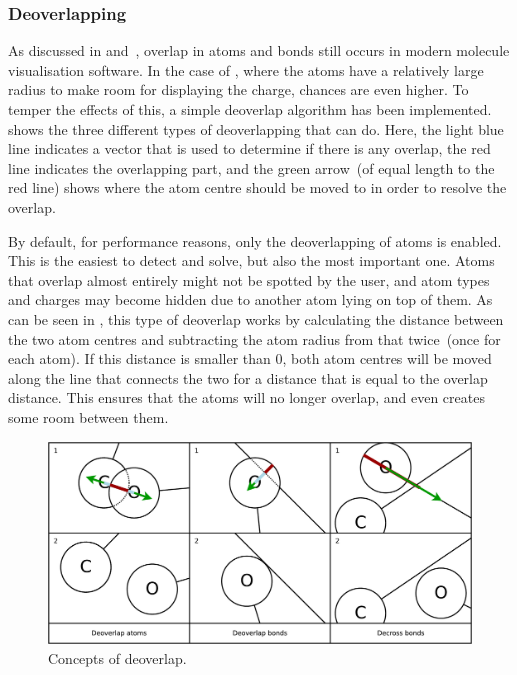 \subsubsection{Deoverlapping}
As discussed in  and~\cite{clark2006structure}, overlap in atoms and bonds still occurs in modern molecule visualisation software. In the case of \oframp, where the atoms have a relatively large radius to make room for displaying the charge, chances are even higher. To temper the effects of this, a simple deoverlap algorithm has been implemented.  shows the three different types of deoverlapping that \oframp{} can do. Here, the light blue line indicates a vector that is used to determine if there is any overlap, the red line indicates the overlapping part, and the green arrow~(of equal length to the red line) shows where the atom centre should be moved to in order to resolve the overlap.

By default, for performance reasons, only the deoverlapping of atoms is enabled. This is the easiest to detect and solve, but also the most important one. Atoms that overlap almost entirely might not be spotted by the user, and atom types and charges may become hidden due to another atom lying on top of them. As can be seen in , this type of deoverlap works by calculating the distance between the two atom centres and subtracting the atom radius from that twice~(once for each atom). If this distance is smaller than $0$, both atom centres will be moved along the line that connects the two for a distance that is equal to the overlap distance. This ensures that the atoms will no longer overlap, and even creates some room between them.

\begin{figure}
\center
\includegraphics[width=\textwidth]{img/deoverlap.pdf}
\caption{Concepts of deoverlap.}
\end{figure}

